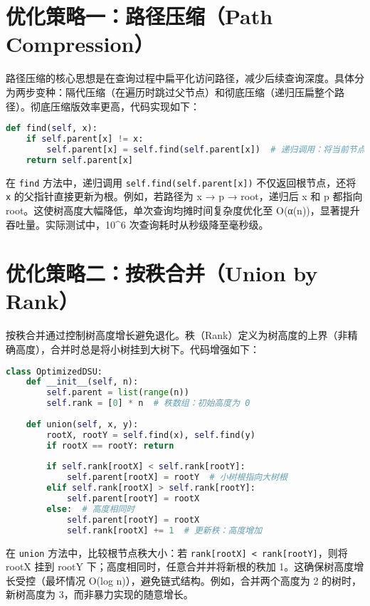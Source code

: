 \chapter{优化策略一：路径压缩（Path Compression）}
路径压缩的核心思想是在查询过程中扁平化访问路径，减少后续查询深度。具体分为两步变种：隔代压缩（在遍历时跳过父节点）和彻底压缩（递归压扁整个路径）。彻底压缩版效率更高，代码实现如下：\par
\begin{lstlisting}[language=python]
def find(self, x):
    if self.parent[x] != x:
        self.parent[x] = self.find(self.parent[x])  # 递归调用：将当前节点父指针直接指向根
    return self.parent[x]
\end{lstlisting}
在 \texttt{find} 方法中，递归调用 \texttt{self.find(self.parent[x])} 不仅返回根节点，还将 \texttt{x} 的父指针直接更新为根。例如，若路径为 x → p → root，递归后 x 和 p 都指向 root。这使树高度大幅降低，单次查询均摊时间复杂度优化至 O(α(n))，显著提升吞吐量。实际测试中，10\^{}6 次查询耗时从秒级降至毫秒级。\par
\chapter{优化策略二：按秩合并（Union by Rank）}
按秩合并通过控制树高度增长避免退化。秩（Rank）定义为树高度的上界（非精确高度），合并时总是将小树挂到大树下。代码增强如下：\par
\begin{lstlisting}[language=python]
class OptimizedDSU:
    def __init__(self, n):
        self.parent = list(range(n))
        self.rank = [0] * n  # 秩数组：初始高度为 0
    
    def union(self, x, y):
        rootX, rootY = self.find(x), self.find(y)
        if rootX == rootY: return
        
        if self.rank[rootX] < self.rank[rootY]:
            self.parent[rootX] = rootY  # 小树根指向大树根
        elif self.rank[rootX] > self.rank[rootY]:
            self.parent[rootY] = rootX
        else:  # 高度相同时
            self.parent[rootY] = rootX
            self.rank[rootX] += 1  # 更新秩：高度增加
\end{lstlisting}
在 \texttt{union} 方法中，比较根节点秩大小：若 \texttt{rank[rootX] < rank[rootY]}，则将 rootX 挂到 rootY 下；高度相同时，任意合并并将新根的秩加 1。这确保树高度增长受控（最坏情况 O(log n)），避免链式结构。例如，合并两个高度为 2 的树时，新树高度为 3，而非暴力实现的随意增长。\par
